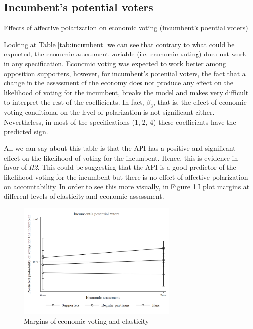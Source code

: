 \documentclass[a4paper, svgnames]{article}
\begin{document}
\subsection{Incumbent's potential voters}

\begin{table}[H]
	\label{main_results}
	\centering
	\caption{\label{tab:incumbent} Effects of affective polarization on economic voting (incumbent's poential voters)}
	

\end{table}

Looking at Table \ref{tab:incumbent} we can see that contrary to what could be expected, the economic assessment variable (i.e. economic voting) does not work in any specification. Economic voting was expected to work better among opposition supporters, however, for incumbent's potential voters, the fact that a change in the assessment of the economy does not produce any effect on the likelihood of voting for the incumbent, breaks the model and makes very difficult to interpret the rest of the coefficients. In fact, $\beta_3$, that is, the effect of economic voting conditional on the level of polarization is not significant either. Nevertheless, in most of the specifications (1, 2, 4) these coefficients have the predicted sign.

All we can say about this table is that the API has a positive and significant effect on the likelihood of voting for the incumbent. Hence, this is evidence in favor of \textit{H2}. This could be suggesting that the API is a good predictor of the likelihood voting for the incumbent but there is no effect of affective polarization on accountability. In order to see this more visually, in Figure \ref{fig:margins} I plot margins at different levels of elasticity and economic assessment.

\begin{figure}[H]
	\centering
	\includegraphics[width=0.7\textwidth]{Figures/margins.png}
	\caption{\label{fig:margins}Margins of economic voting and elasticity }
\end{figure}
\end{document}
